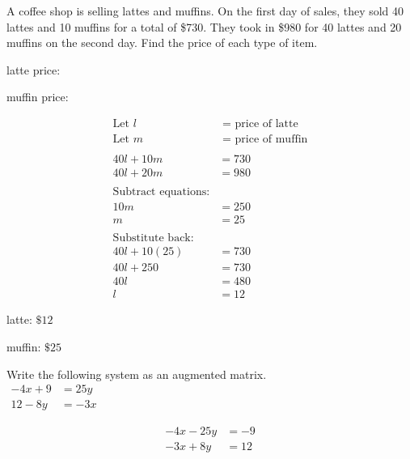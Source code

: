 \documentclass[11pt]{exam}
\begin{document}
\begin{questions}
\question[6]
A coffee shop is selling lattes and muffins. On the first day of sales, they sold 40 lattes and 10 muffins for a total of \$730. They took in \$980 for 40 lattes and 20 muffins on the second day. Find the price of each type of item.\\\vspace{12pt}
    
         latte price: \fillin[][2in]\\\vspace{12pt}
        
         muffin price: \fillin[][2in]\\
\begin{solution}
\[\begin{aligned} \text{Let } l &\text{ = price of latte} \\ \text{Let } m &\text{ = price of muffin} \\ \\ 40l + 10m &= 730 \\ 40l + 20m &= 980 \\ \\ \text{Subtract equations:} & \\ 10m &= 250 \\ m &= 25 \\ \\ \text{Substitute back:} & \\ 40l + 10(25) &= 730 \\ 40l + 250 &= 730 \\ 40l &= 480 \\ l &= 12 \end{aligned}\]

latte: \(\boxed{ \text{\$} 12 }\)

muffin: \(\boxed{ \text{\$} 25 }\)
\end{solution}

\question[4] 
Write the following system as an augmented matrix.\\

\(\displaystyle{ \begin{aligned} -4x + 9 &= 25y \\ 12 - 8y &= -3x \end{aligned} }\)\\
\begin{solution}
\[\begin{aligned} -4x - 25y &= -9 \\ -3x + 8y &= 12 \end{aligned}\]


\end{solution}
\end{questions}
\end{document}
